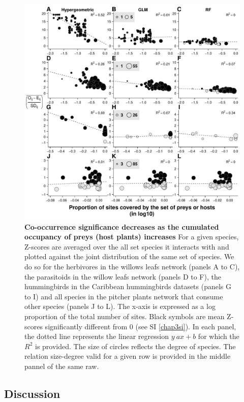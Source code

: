 \begin{figure}[htbp]
\centering
\includegraphics[width=.95\textwidth]{chapitre3/figdegocc.pdf}
\caption[Co-occurrence significance decreases as the cumulated
occupancy increases]{\textbf{Co-occurrence significance decreases as the cumulated
occupancy of preys (host plants) increases} For a given species, Z-scores are averaged over the
all set species it interacts with and plotted against the joint
distribution of the same set of species. We do so for the herbivores in
the willows leafs network (panels A to C), the parasitoids in the willow
leafs network (panels D to F), the hummingbirds in the Caribbean
hummingbirds datasets (panels G to I) and all species in the pitcher
plants network that consume other species (panels J to L). The x-axis is
expressed as a log proportion of the total number of sites. Black
symbols are mean Z-scores significantly different from 0 (see SI
\ref{chap3si}). In each panel, the dotted line represents the linear
regression \(y~ax+b\) for which the \(R^2\) is provided. The size of
circles reflects the degree of species. The relation size-degree valid
for a given row is provided in the middle pannel of the same raw.
\label{fig:degocc}}
\end{figure}

\subsection{Discussion}\label{discussion}

